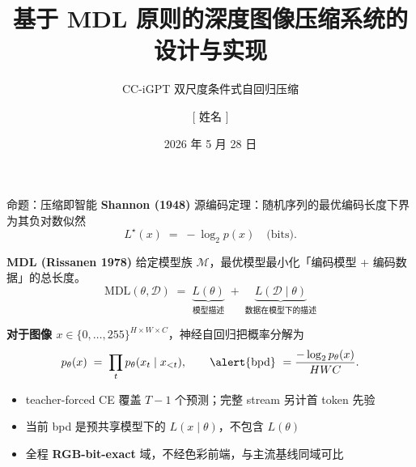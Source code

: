 \documentclass[10pt,aspectratio=169]{beamer}
\title{基于 MDL 原则的深度图像压缩系统的设计与实现}
\subtitle{CC-iGPT 双尺度条件式自回归压缩}
\author{[ 姓名 ]}
\institute{[ 学院 / 学校 ] \quad 指导教师: [ 导师姓名 ]}
\date{2026 年 5 月 28 日}
\begin{document}
\maketitle

\begin{frame}{命题：压缩即智能}
\textbf{Shannon (1948)} \;源编码定理：随机序列的最优编码长度下界为其负对数似然
\[
L^{\star}(x) \;=\; -\log_2 p(x) \quad \text{(bits)}.
\]

\textbf{MDL (Rissanen 1978)} \;给定模型族 $\mathcal{M}$，最优模型最小化「编码模型 + 编码数据」的总长度。
\[
\mathrm{MDL}(\theta, \mathcal{D}) \;=\; \underbrace{L(\theta)}_{\text{模型描述}} \;+\; \underbrace{L(\mathcal{D}\mid\theta)}_{\text{数据在模型下的描述}}
\]

\medskip
\textbf{对于图像 $x \in \{0,\dots,255\}^{H\times W\times C}$}，神经自回归把概率分解为
\[
p_\theta(x) \;=\; \prod_t p_\theta(x_t \mid x_{<t}),
\qquad
\text{\alert{bpd} } = \frac{-\log_2 p_\theta(x)}{H W C}.
\]

\medskip
\begin{itemize}
  \item teacher-forced CE 覆盖 $T-1$ 个预测；完整 stream 另计首 token 先验
  \item 当前 bpd 是预共享模型下的 $L(x\mid\theta)$，不包含 $L(\theta)$
  \item 全程 \textbf{RGB-bit-exact} 域，不经色彩前端，与主流基线同域可比
\end{itemize}
\end{frame}
\end{document}

